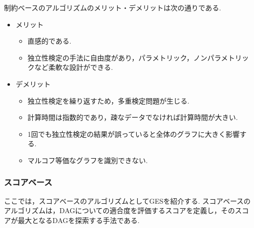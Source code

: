 \documentclass[uplatex, dvipdfmx]{jsarticle}
\begin{document}

制約ベースのアルゴリズムのメリット・デメリットは次の通りである.
\begin{itemize}
  \item メリット
    \begin{itemize}
      \item 直感的である.
      \item 独立性検定の手法に自由度があり，パラメトリック，ノンパラメトリックなど柔軟な設計ができる.
    \end{itemize}

  \item デメリット
    \begin{itemize}
      \item 独立性検定を繰り返すため，多重検定問題が生じる.
      \item 計算時間は指数的であり，疎なデータでなければ計算時間が大きい.
      \item 1回でも独立性検定の結果が誤っていると全体のグラフに大きく影響する.
      \item マルコフ等価なグラフを識別できない.
    \end{itemize}
  \end{itemize}  

\subsubsection*{スコアベース}
ここでは，スコアベースのアルゴリズムとしてGESを紹介する.
スコアベースのアルゴリズムは，DAGについての適合度を評価するスコアを定義し，そのスコアが最大となるDAGを探索する手法である.
\end{document}
